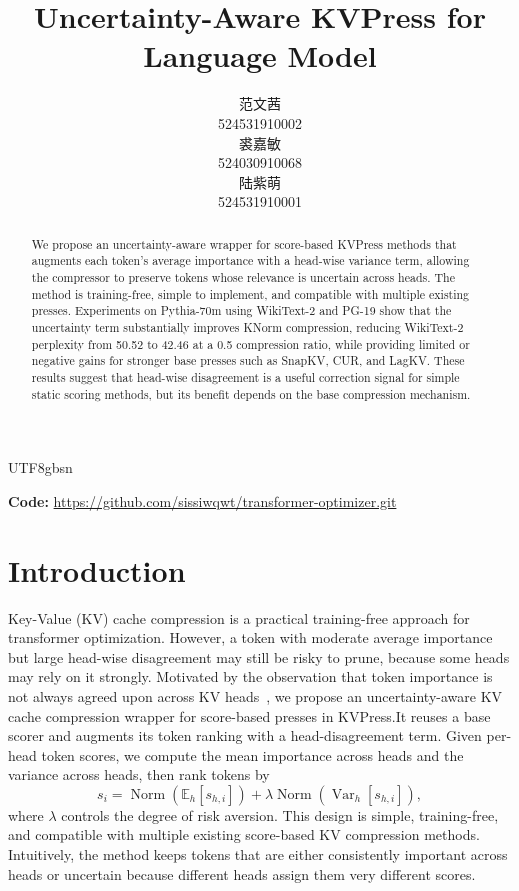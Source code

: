 \documentclass{article}
\title{Uncertainty-Aware KVPress for Language Model}
\begin{document}
\begin{CJK*}{UTF8}{gbsn}
\author{%
  范文茜 \\
  524531910002 \\
  \And
  裘嘉敏 \\
  524030910068 \\
  \And
  陆紫萌 \\
  524531910001 \\
}
\maketitle
\end{CJK*}

\begin{center}
  \textbf{Code:} \url{https://github.com/sissiwqwt/transformer-optimizer.git}
  \end{center}

\begin{abstract}
  We propose an uncertainty-aware wrapper
  for score-based KVPress methods that augments each token's average importance
  with a head-wise variance term, allowing the compressor to preserve tokens
  whose relevance is uncertain across heads. The method is training-free,
  simple to implement, and compatible with multiple existing presses. Experiments
  on Pythia-70m using WikiText-2 and PG-19 show that the uncertainty term
  substantially improves KNorm compression, reducing WikiText-2 perplexity from
  50.52 to 42.46 at a 0.5 compression ratio, while providing limited or negative
  gains for stronger base presses such as SnapKV, CUR, and LagKV. These results
  suggest that head-wise disagreement is a useful correction signal for simple
  static scoring methods, but its benefit depends on the base compression
  mechanism.
\end{abstract}


\section{Introduction}

Key-Value (KV) cache compression is a practical training-free approach for transformer optimization. However, a token with moderate average importance but large head-wise disagreement may still be risky to prune, because some heads may rely on it strongly. Motivated by the observation that token importance is not always
  agreed upon across KV heads~\citep{ICLR2024_639a9a17}, we propose an uncertainty-aware KV cache compression wrapper for score-based presses in KVPress.It reuses a base scorer and augments its token ranking with a head-disagreement term. Given per-head token scores, we compute the mean importance across heads and the variance across heads, then rank tokens by
  \[
      s_i = \operatorname{Norm}\!\left(\mathbb{E}_{h}[s_{h,i}]\right)
      + \lambda \operatorname{Norm}\!\left(\operatorname{Var}_{h}
  [s_{h,i}]\right),
  \]
  where $\lambda$ controls the degree of risk aversion. This design is simple, training-free, and compatible with multiple existing score-based KV compression methods. Intuitively, the method keeps tokens that are either consistently important across heads or uncertain because different heads assign them very different scores. 
\end{document}
